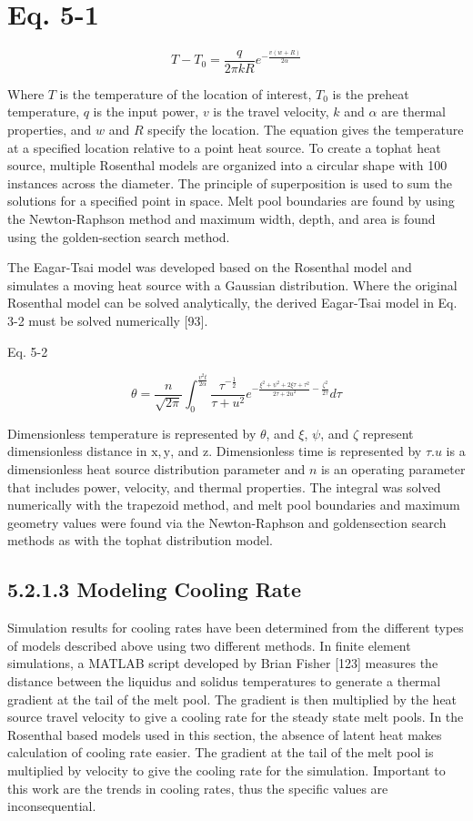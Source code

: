 \documentclass[10pt]{article}
\begin{document}
\section*{Eq. 5-1}
$$
T-T_{0}=\frac{q}{2 \pi k R} e^{-\frac{v(w+R)}{2 \alpha}}
$$

Where $T$ is the temperature of the location of interest, $T_{0}$ is the preheat temperature, $q$ is the input power, $v$ is the travel velocity, $k$ and $\alpha$ are thermal properties, and $w$ and $R$ specify the location. The equation gives the temperature at a specified location relative to a point heat source. To create a tophat heat source, multiple Rosenthal models are organized into a circular shape with 100 instances across the diameter. The principle of superposition is used to sum the solutions for a specified point in space. Melt pool boundaries are found by using the Newton-Raphson method and maximum width, depth, and area is found using the golden-section search method.

The Eagar-Tsai model was developed based on the Rosenthal model and simulates a moving heat source with a Gaussian distribution. Where the original Rosenthal model can be solved analytically, the derived Eagar-Tsai model in Eq. 3-2 must be solved numerically [93].

Eq. 5-2

$$
\theta=\frac{n}{\sqrt{2 \pi}} \int_{0}^{\frac{v^{2} t}{2 \alpha}} \frac{\tau^{-\frac{1}{2}}}{\tau+u^{2}} e^{-\frac{\xi^{2}+\psi^{2}+2 \xi \tau+\tau^{2}}{2 \tau+2 u^{2}}-\frac{\zeta^{2}}{2 \tau}} d \tau
$$

Dimensionless temperature is represented by $\theta$, and $\xi$, $\psi$, and $\zeta$ represent dimensionless distance in $\mathrm{x}, \mathrm{y}$, and $\mathrm{z}$. Dimensionless time is represented by $\tau . u$ is a dimensionless heat source distribution parameter and $n$ is an operating parameter that includes power, velocity, and thermal properties. The integral was solved numerically with the trapezoid method, and melt pool boundaries and maximum geometry values were found via the Newton-Raphson and goldensection search methods as with the tophat distribution model.

\subsection*{5.2.1.3 Modeling Cooling Rate}
Simulation results for cooling rates have been determined from the different types of models described above using two different methods. In finite element simulations, a MATLAB script developed by Brian Fisher [123] measures the distance between the liquidus and solidus temperatures to generate a thermal gradient at the tail of the melt pool. The gradient is then multiplied by the heat source travel velocity to give a cooling rate for the steady state melt pools. In the Rosenthal based models used in this section, the absence of latent heat makes calculation of cooling rate easier. The gradient at the tail of the melt pool is multiplied by velocity to give the cooling rate for the simulation. Important to this work are the trends in cooling rates, thus the specific values are inconsequential.
\end{document}
